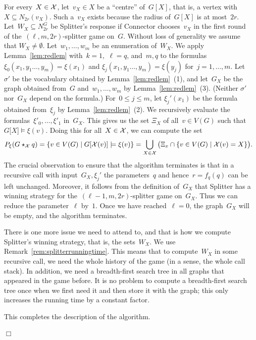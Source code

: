 \documentclass[11pt]{article}
\numberwithin{equation}{section}
\def\qed{\hspace*{\fill}$\Box$}
\newenvironment{proof}[1][]%
{\ifthenelse{\equal{#1}{}}{\noindent\textit{Proof.
    }}{\noindent\textit{#1. }}}%
{\qed\par\smallskip}
\begin{document}
\begin{proof}[Proof of Theorem~\ref{theo:main+u}]
  For every~$X\in\mathcal{X}$, let~$v_X\in X$ be a ``centre'' of~$G[X]$, that
  is, a vertex with~$X\subseteq N_{2r}(v_X)$. Such a~$v_X$ exists
  because the radius of~$G[X]$ is at most~$2r$. Let~$W_X\subseteq
  N_{2r}^G$ be Splitter's response if Connector chooses~$v_X$ in the
  first round of the~$(\ell,m,2r)$-splitter game on~$G$. Without loss
  of generality we assume that
  $W_X\neq\emptyset$. Let~$w_1,\ldots,w_m$ be an enumeration
  of~$W_X$. We apply Lemma~\ref{lem:redlem} with~$k=1$,~$\ell=q$,
  and~$m,q$ to the formulas~$\xi_0(x_1,y_1\ldots,y_m)=\xi(x_1)$ and
  $\xi_j(x_1,y_1\ldots,y_m)=\xi(y_j)$ for~$j=1,\ldots,m$.
  Let~$\sigma'$ be the vocabulary obtained by
  Lemma~\ref{lem:redlem}~(1), and let~$G_X$ be the graph obtained
  from~$G$ and~$w_1,\ldots,w_m$ by
  Lemma~\ref{lem:redlem}~(3). (Neither $\sigma'$ nor~$G_X$ depend on
  the formula.) For~$0\le j\le m$, let $\xi_j'(x_1)$ be the formula
  obtained from~$\xi_j$ by Lemma~\ref{lem:redlem}~(2).  We recursively
  evaluate the formulas~$\xi'_0,\ldots,\xi'_1$ in~$G_X$. This gives us
  the set $\Xi_X$ of all~$v\in V(G)$ such that
  $G\big[X\big]\models\xi(v)$. Doing this for all~$X\in\mathcal{X}$, we can
  compute the set
  \[
  P_\xi(G\star_{\mathcal{X}}q)=\{v\in V(G)\mid G[\mathcal{X}(v)]\models\xi(v)\}
  =\bigcup_{X\in\mathcal{X}}\big(\Xi_x\cap\{v\in V(G)\mid \mathcal{X}(v)=X\}\big).
  \]
  The crucial observation to ensure that the algorithm terminates is
  that in a recursive call with input~$G_X,\xi_j'$ the parameters~$q$
  and hence~$r=f_q(q)$ can be left unchanged. Moreover, it follows
  from the definition of~$G_X$ that Splitter has a winning strategy
  for the~$(\ell-1,m,2r)$-splitter game on~$G_X$. Thus we can reduce
  the parameter~$\ell$ by~$1$. Once we have reached~$\ell=0$, the
  graph~$G_X$ will be empty, and the algorithm terminates.

  There is one more issue we need to attend to, and that is how we
  compute Splitter's winning strategy, that is, the sets~$W_X$. We use
  Remark~\ref{rem:splitterrunningtime}. This means that to
  compute~$W_X$ in some recursive call, we need the whole history of
  the game (in a sense, the whole call stack). In addition, we need a
  breadth-first search tree in all graphs that appeared in the game
  before. It is no problem to compute a breadth-first search tree once
  when we first need it and then store it with the graph; this only
  increases the running time by a constant factor.

  This completes the description of the algorithm.


\end{proof}
\end{document}
